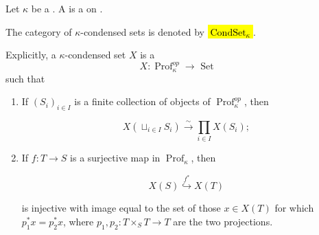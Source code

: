 \begin{definition} \label{definition:kappa_condensed_set_for_a_cardinal}
    Let $\kappa$ be a . 
    A  is a  on .

    The category of $\kappa$-condensed sets is denoted by \hl{$\operatorname{CondSet}_{\kappa}$}.

    Explicitly, a $\kappa$-condensed set $X$ is a 
    $$ X: \operatorname{Prof}_{\kappa}^{o p} \rightarrow \text { Set } $$
    such that

    \begin{enumerate}
        \item If $\left(S_{i}\right)_{i \in I}$ is a finite collection of objects of $\operatorname{Prof}_{\kappa}^{o p}$, then

        $$ X\left(\sqcup_{i \in I} S_{i}\right) \xrightarrow{\sim} \prod_{i \in I} X\left(S_{i}\right) ; $$

        \item If $f: T \rightarrow S$ is a surjective map in $\operatorname{Prof}_{\kappa}$, then

        $$ X(S) \stackrel{f^{*}}{\hookrightarrow} X(T) $$

        is injective with image equal to the set of those $x \in X(T)$ for which $p_{1}^{*} x=p_{2}^{*} x$, where $p_{1}, p_{2}: T \times_{S} T \rightarrow T$ are the two projections.
    \end{enumerate}





\end{definition}
